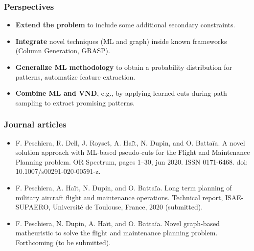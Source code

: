 \begin{frame}
\frametitle{\textbf{Perspectives}}
    \begin{itemize}[<+->]
      \item \textbf{Extend the problem} to include some additional secondary constraints.        
      \item \textbf{Integrate} novel techniques (ML and graph) inside known frameworks (Column Generation, GRASP).
      \item \textbf{Generalize ML methodology}
        to obtain a probability distribution for patterns, automatize feature extraction.
      \item \textbf{Combine ML and VND},
        e.g., by applying learned-cuts during path-sampling to extract promising patterns.
    \end{itemize}
\end{frame}

\begin{frame}
\frametitle{\textbf{Journal articles}}


  \begin{itemize}
    \item F. Peschiera, R. Dell, J. Royset, A. Haït, N. Dupin, and O. Battaïa. A novel solution approach with ML-based pseudo-cuts for the Flight and Maintenance Planning problem. OR Spectrum, pages 1–30, jun 2020. ISSN 0171-6468. doi: 10.1007/s00291-020-00591-z.

    \item F. Peschiera, A. Haït, N. Dupin, and O. Battaïa. Long term planning of military aircraft flight and maintenance operations. Technical report, ISAE-SUPAERO, Université de Toulouse, France, 2020 (submitted).

    \item  F. Peschiera, N. Dupin, A. Haït, and O. Battaïa. Novel graph-based matheuristic to solve the flight and maintenance planning problem. Forthcoming (to be submitted).
  \end{itemize}

\end{frame}

